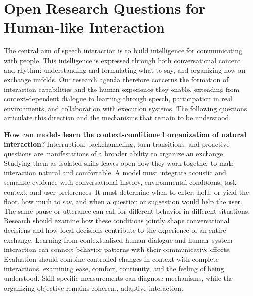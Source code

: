 
\section{Open Research Questions for Human-like Interaction}
\label{sec:prospects}

The central aim of speech interaction is to build intelligence for communicating with people. This intelligence is expressed through both conversational content and rhythm: understanding and formulating what to say, and organizing how an exchange unfolds. Our research agenda therefore concerns the formation of interaction capabilities and the human experience they enable, extending from context-dependent dialogue to learning through speech, participation in real environments, and collaboration with execution systems. The following questions articulate this direction and the mechanisms that remain to be understood.

\textbf{How can models learn the context-conditioned organization of natural interaction?} Interruption, backchanneling, turn transitions, and proactive questions are manifestations of a broader ability to organize an exchange. Studying them as isolated skills leaves open how they work together to make interaction natural and comfortable. A model must integrate acoustic and semantic evidence with conversational history, environmental conditions, task context, and user preferences. It must determine when to enter, hold, or yield the floor, how much to say, and when a question or suggestion would help the user. The same pause or utterance can call for different behavior in different situations. Research should examine how these conditions jointly shape conversational decisions and how local decisions contribute to the experience of an entire exchange. Learning from contextualized human dialogue and human–system interaction can connect behavior patterns with their communicative effects. Evaluation should combine controlled changes in context with complete interactions, examining ease, comfort, continuity, and the feeling of being understood. Skill-specific measurements can diagnose mechanisms, while the organizing objective remains coherent, adaptive interaction.

